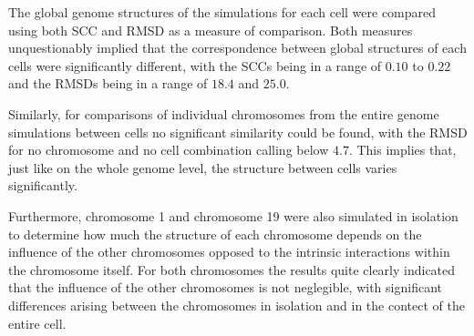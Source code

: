 The global genome structures of the simulations for each cell were compared using both SCC and RMSD as a measure of comparison. Both measures unquestionably implied that the correspondence between global structures of each cells were significantly different, with the SCCs being in a range of \(0.10\) to \(0.22\) and the RMSDs being in a range of \(18.4\) and \(25.0\).

Similarly, for comparisons of individual chromosomes from the entire genome simulations between cells no significant similarity could be found, with the RMSD for no chromosome and no cell combination calling below \(4.7\). This implies that, just like on the whole genome level, the structure between cells varies significantly.

Furthermore, chromosome 1 and chromosome 19 were also simulated in isolation to determine how much the structure of each chromosome depends on the influence of the other chromosomes opposed to the intrinsic interactions within the chromosome itself. For both chromosomes the results quite clearly indicated that the influence of the other chromosomes is not neglegible, with significant differences arising between the chromosomes in isolation and in the contect of the entire cell.

